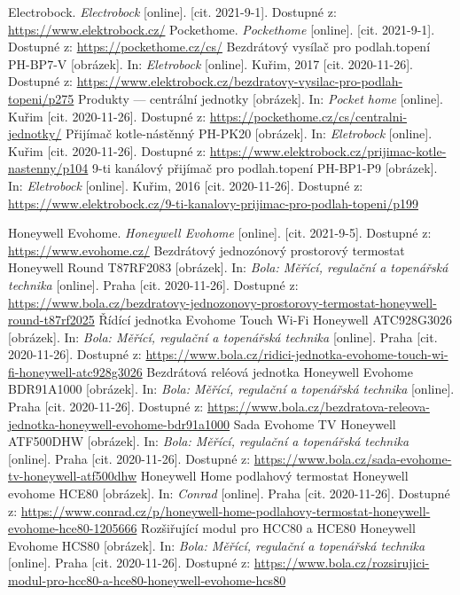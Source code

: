 \begin{thebibliography}{3}
Electrobock. \textit{Electrobock} [online]. [cit. 2021-9-1]. Dostupné z: \url{https://www.elektrobock.cz/}
Pockethome.  \textit{Pockethome} [online]. [cit. 2021-9-1]. Dostupné z: \url{https://pockethome.cz/cs/}
Bezdrátový vysílač pro podlah.topení PH-BP7-V [obrázek]. In: \textit{Eletrobock} [online]. Kuřim, 2017 [cit. 2020-11-26]. Dostupné z: \url{https://www.elektrobock.cz/bezdratovy-vysilac-pro-podlah-topeni/p275}
Produkty --- centrální jednotky [obrázek]. In: \textit{Pocket home} [online]. Kuřim [cit. 2020-11-26]. Dostupné z: \url{https://pockethome.cz/cs/centralni-jednotky/}
Přijímač kotle-nástěnný PH-PK20 [obrázek]. In: \textit{Eletrobock} [online]. Kuřim [cit. 2020-11-26]. Dostupné z: \url{https://www.elektrobock.cz/prijimac-kotle-nastenny/p104}
9-ti kanálový přijímač pro podlah.topení PH-BP1-P9 [obrázek]. In: \textit{Eletrobock} [online]. Kuřim, 2016 [cit. 2020-11-26]. Dostupné z: \url{https://www.elektrobock.cz/9-ti-kanalovy-prijimac-pro-podlah-topeni/p199}

Honeywell Evohome. \textit{Honeywell Evohome} [online]. [cit. 2021-9-5]. Dostupné z: \url{https://www.evohome.cz/}
Bezdrátový jednozónový prostorový termostat Honeywell Round T87RF2083 [obrázek]. In: \textit{Bola: Měřící, regulační a topenářská technika} [online]. Praha [cit. 2020-11-26]. Dostupné z: \url{https://www.bola.cz/bezdratovy-jednozonovy-prostorovy-termostat-honeywell-round-t87rf2025}
Řídící jednotka Evohome Touch Wi-Fi Honeywell ATC928G3026 [obrázek]. In: \textit{Bola: Měřící, regulační a topenářská technika} [online]. Praha [cit. 2020-11-26]. Dostupné z: \url{https://www.bola.cz/ridici-jednotka-evohome-touch-wi-fi-honeywell-atc928g3026}
Bezdrátová reléová jednotka Honeywell Evohome BDR91A1000 [obrázek]. In: \textit{Bola: Měřící, regulační a topenářská technika} [online]. Praha [cit. 2020-11-26]. Dostupné z: \url{https://www.bola.cz/bezdratova-releova-jednotka-honeywell-evohome-bdr91a1000}
Sada Evohome TV Honeywell ATF500DHW [obrázek]. In: \textit{Bola: Měřící, regulační a topenářská technika} [online]. Praha [cit. 2020-11-26]. Dostupné z: \url{https://www.bola.cz/sada-evohome-tv-honeywell-atf500dhw}
Honeywell Home podlahový termostat Honeywell evohome HCE80 [obrázek]. In: \textit{Conrad} [online]. Praha [cit. 2020-11-26]. Dostupné z: \url{https://www.conrad.cz/p/honeywell-home-podlahovy-termostat-honeywell-evohome-hce80-1205666}
Rozšiřující modul pro HCC80 a HCE80 Honeywell Evohome HCS80 [obrázek]. In: \textit{Bola: Měřící, regulační a topenářská technika} [online]. Praha [cit. 2020-11-26]. Dostupné z: \url{https://www.bola.cz/rozsirujici-modul-pro-hcc80-a-hce80-honeywell-evohome-hcs80}


\end{thebibliography}
